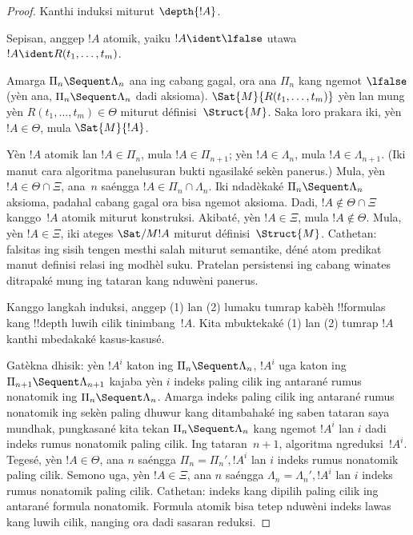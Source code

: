 \documentclass[../../../include/open-logic-section]{subfiles}
\begin{document}
\begin{proof}
  Kanthi induksi miturut $\depth{!A}$.

Sepisan, anggep $!A$ atomik, yaiku $!A \ident \lfalse$
utawa $!A \ident R(t_1, \dots, t_m)$.

Amarga $\Pi_n \Sequent \Lambda_n$ ana ing cabang gagal,
ora ana $\Pi_n$ kang ngemot $\lfalse$ (yèn ana,
$\Pi_n \Sequent \Lambda_n$ dadi aksioma).
$\Sat{M}{R(t_1, \dots, t_m)}$
yèn lan mung yèn $R(t_1, \dots, t_m) \in \Theta$
miturut définisi~$\Struct{M}$.
Saka loro prakara iki, yèn $!A \in \Theta$,
mula $\Sat{M}{!A}$.

Yèn $!A$ atomik lan $!A \in \Pi_n$, mula
$!A \in \Pi_{n+1}$; yèn $!A \in \Lambda_n$, mula
$!A \in \Lambda_{n+1}$. (Iki manut cara algoritma
panelusuran bukti ngasilaké sekèn panerus.) Mula,
yèn $!A \in \Theta \cap \Xi$, ana~$n$ saéngga
$!A \in \Pi_n \cap \Lambda_n$. Iki ndadèkaké
$\Pi_n \Sequent \Lambda_n$ aksioma, padahal cabang gagal
ora bisa ngemot aksioma. Dadi,
$!A \notin \Theta \cap \Xi$ kanggo~$!A$ atomik
miturut konstruksi. Akibaté,
yèn $!A \in \Xi$, mula $!A \notin \Theta$.
Mula, yèn $!A \in \Xi$, iki ateges $\Sat/{M}{!A}$
miturut définisi~$\Struct{M}$.
Cathetan: falsitas ing sisih tengen mesthi salah miturut semantike, déné atom predikat manut definisi relasi ing modhèl suku. Pratelan persistensi ing cabang winates ditrapaké mung ing tataran kang nduwèni panerus.

Kanggo langkah induksi, anggep (1) lan (2) lumaku tumrap
kabèh !!{formula}s kang !!{depth} luwih cilik tinimbang~$!A$.
Kita mbuktekaké (1) lan (2) tumrap $!A$ kanthi mbedakaké
kasus-kasusé.

Gatèkna dhisik: yèn $!A^i$ katon ing
$\Pi_n \Sequent \Lambda_n$, $!A^i$ uga katon ing
$\Pi_{n+1} \Sequent \Lambda_{n+1}$ kajaba yèn $i$
indeks paling cilik ing antarané rumus nonatomik ing
$\Pi_n \Sequent \Lambda_n$. Amarga indeks paling cilik
ing antarané rumus nonatomik ing sekèn paling dhuwur
kang ditambahaké ing saben tataran saya mundhak, pungkasané
kita tekan $\Pi_n \Sequent \Lambda_n$ kang ngemot $!A^i$
lan $i$ dadi indeks rumus nonatomik paling cilik.
Ing tataran~$n+1$,
algoritma ngreduksi~$!A^i$. Tegesé, yèn $!A \in \Theta$,
ana $n$ saéngga $\Pi_n = \Pi_n', !A^i$ lan $i$
indeks rumus nonatomik paling cilik. Semono uga,
yèn $!A \in \Xi$,
ana $n$ saéngga $\Lambda_n = \Lambda_n', !A^i$
lan $i$ indeks rumus nonatomik paling cilik.
Cathetan: indeks kang dipilih paling cilik ing antarané formula nonatomik. Formula atomik bisa tetep nduwèni indeks lawas kang luwih cilik, nanging ora dadi sasaran reduksi.


\end{proof}
\end{document}
